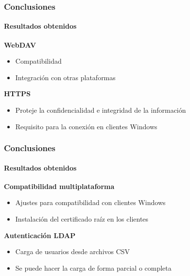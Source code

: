 \documentclass{beamer}
\begin{document}

\begin{frame}
\frametitle{Conclusiones}
\framesubtitle{Resultados obtenidos}
\justifying

\textbf{\textup{WebDAV}}
\begin{itemize}
 \item Compatibilidad
 \item Integraci\'{o}n con otras plataformas
\end{itemize}

\vspace{2em}

\textbf{\textup{HTTPS}}
\begin{itemize}
 \item Proteje la confidencialidad e integridad de la informaci\'{o}n
 \item Requisito para la conexi\'{o}n en clientes Windows
\end{itemize}

\end{frame}


\begin{frame}
\frametitle{Conclusiones}
\framesubtitle{Resultados obtenidos}
\justifying

\textbf{Compatibilidad multiplataforma}
\begin{itemize}
 \item Ajustes para compatibilidad con clientes Windows
 \item Instalaci\'{o}n del certificado ra\'{i}z en los clientes
\end{itemize}

\vspace{2em}

\textbf{Autenticaci\'{o}n \textup{LDAP}}
\begin{itemize}
 \item Carga de usuarios desde archivos \textup{CSV}
 \item Se puede hacer la carga de forma parcial o completa
\end{itemize}

\end{frame}

\end{document}
